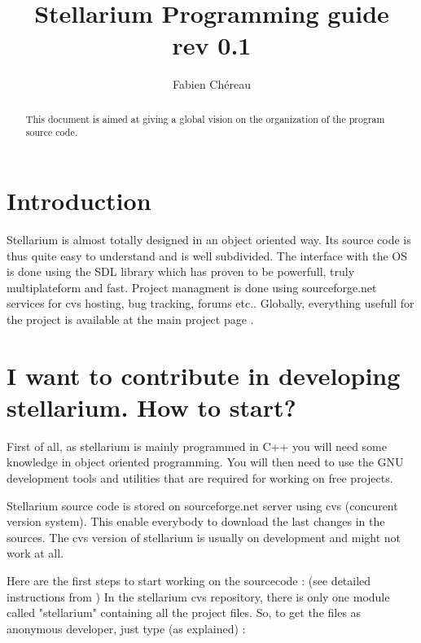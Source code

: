 \documentclass[11pt,oneside] {article}
\begin{document}
\title{\textbf{Stellarium Programming guide} \\{rev 0.1}}
\author{Fabien Ch\'ereau}

\maketitle

\begin{abstract}
This document is aimed at giving a global vision on the organization of the program source code.
\end{abstract}

\section{Introduction}
Stellarium is almost totally designed in an object oriented way. Its source code is thus quite easy to understand and is well subdivided.
The interface with the OS is done using the SDL library which has proven to be powerfull, truly multiplateform and fast.
Project managment is done using sourceforge.net services for cvs hosting, bug tracking, forums etc.. Globally, everything usefull for the project is available at the main project page .

\section{I want to contribute in developing stellarium. How to start?}
First of all, as stellarium is mainly programmed in C++ you will need some knowledge in object oriented programming.
You will then need to use the GNU development tools and utilities that are required for working on free projects.

Stellarium source code is stored on sourceforge.net server using cvs (concurent version system). This enable everybody to download the last changes in the sources. The cvs version of stellarium is usually on development and might not work at all.


Here are the first steps to start working on the sourcecode : (see detailed instructions from )
In the stellarium cvs repository, there is only one module called "stellarium"
containing all the project files. So, to get the files as anonymous developer, just type (as explained) :
\end{document}
